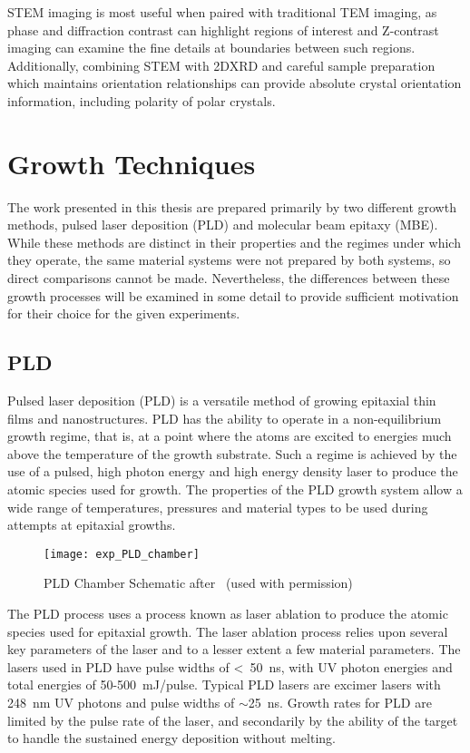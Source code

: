 STEM imaging is most useful when paired with traditional TEM imaging, as phase and diffraction contrast can highlight regions of interest and Z-contrast imaging can examine the fine details at boundaries between such regions.
Additionally, combining STEM with 2DXRD and careful sample preparation which maintains orientation relationships can provide absolute crystal orientation information, including polarity of polar crystals.

\section{Growth Techniques}
The work presented in this thesis are prepared primarily by two different growth methods, pulsed laser deposition (PLD) and molecular beam epitaxy (MBE).
While these methods are distinct in their properties and the regimes under which they operate, the same material systems were not prepared by both systems, so direct comparisons cannot be made.
Nevertheless, the differences between these growth processes will be examined in some detail to provide sufficient motivation for their choice for the given experiments.
\subsection{PLD} Pulsed laser deposition (PLD) is a versatile method of growing epitaxial thin films and nanostructures.
PLD has the ability to operate in a non-equilibrium growth regime, that is, at a point where the atoms are excited to energies much above the temperature of the growth substrate.
Such a regime is achieved by the use of a pulsed, high photon energy and high energy density laser to produce the atomic species used for growth.
The properties of the PLD growth system allow a wide range of temperatures, pressures and material types to be used during attempts at epitaxial growths.
\begin{figure}
 \centering \texttt{[image: exp\_PLD\_chamber]}
 \caption{\label{fig:exp_pld_chamber}PLD Chamber Schematic after~\cite{stephen-thesis} (used with permission)}
\end{figure}

The PLD process uses a process known as laser ablation to produce the atomic species used for epitaxial growth.
The laser ablation process relies upon several key parameters of the laser and to a lesser extent a few material parameters.
The lasers used in PLD have pulse widths of <~50~ns, with UV photon energies and total energies of 50-500~mJ/pulse.
Typical PLD lasers are excimer lasers with 248~nm UV photons and pulse widths of \(\sim\)25~ns.
Growth rates for PLD are limited by the pulse rate of the laser, and secondarily by the ability of the target to handle the sustained energy deposition without melting.


